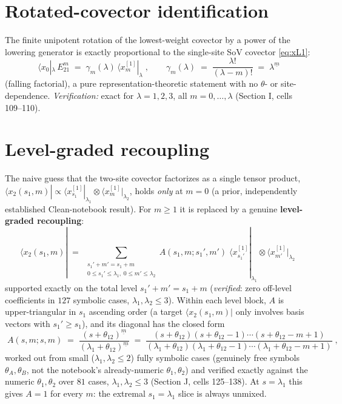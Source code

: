 \documentclass[11pt]{article}
\newcommand{\ffact}[2]{#1^{\underline{#2}}}   %
\begin{document}
\section{Rotated-covector identification}
\label{sec:covector-id}

The finite unipotent rotation of the lowest-weight covector by a power of the lowering generator is
exactly proportional to the single-site SoV covector \eqref{eq:xL1}:
\begin{equation}
  \boxed{\;\langle x_0|_\lambda\, E_{21}^m \;=\; \gamma_m(\lambda)\,\langle x^{[1]}_m|_\lambda\;},
  \qquad
  \gamma_m(\lambda) \;=\; \frac{\lambda!}{(\lambda-m)!} \;=\; \ffact{\lambda}{m}
  \label{eq:gamma}
\end{equation}
(falling factorial), a pure representation-theoretic statement with no $\theta$- or site-dependence.
\emph{Verification:} exact for $\lambda=1,2,3$, all $m=0,\dots,\lambda$ (Section I, cells 109--110).

\section{Level-graded recoupling}
\label{sec:recoupling}

The naive guess that the two-site covector factorizes as a single tensor product,
$\langle x_2(s_1,m)| \propto \langle x^{[1]}_{s_1}|_{\lambda_1}\otimes\langle x^{[1]}_m|_{\lambda_2}$,
holds \emph{only} at $m=0$ (a prior, independently established Clean-notebook result). For $m\ge1$
it is replaced by a genuine \textbf{level-graded recoupling}:
\begin{equation}
  \boxed{\;\langle x_2(s_1,m)| \;=\;\!\!\sum_{\substack{s_1'+m'=s_1+m\\ 0\le s_1'\le\lambda_1,\;0\le m'\le\lambda_2}}\!\!
  A(s_1,m;s_1',m')\;\langle x^{[1]}_{s_1'}|_{\lambda_1}\otimes\langle x^{[1]}_{m'}|_{\lambda_2}\;}
  \label{eq:A-decomp}
\end{equation}
supported exactly on the total level $s_1'+m'=s_1+m$ (\emph{verified}: zero off-level coefficients
in $127$ symbolic cases, $\lambda_1,\lambda_2\le3$). Within each level block, $A$ is upper-triangular
in $s_1$ ascending order (a target $\langle x_2(s_1,m)|$ only involves basis vectors with
$s_1'\ge s_1$), and its diagonal has the closed form
\begin{equation}
  \boxed{\;A(s,m;s,m) \;=\; \frac{\ffact{(s+\theta_{12})}{m}}{\ffact{(\lambda_1+\theta_{12})}{m}}
  \;=\; \frac{(s+\theta_{12})(s+\theta_{12}-1)\cdots(s+\theta_{12}-m+1)}
             {(\lambda_1+\theta_{12})(\lambda_1+\theta_{12}-1)\cdots(\lambda_1+\theta_{12}-m+1)}\;},
  \label{eq:A-diag}
\end{equation}
worked out from small ($\lambda_1,\lambda_2\le2$) fully symbolic cases (genuinely free symbols
$\theta_A,\theta_B$, not the notebook's already-numeric $\theta_1,\theta_2$) and verified exactly
against the numeric $\theta_1,\theta_2$ over $81$ cases, $\lambda_1,\lambda_2\le3$ (Section J, cells
125--138). At $s=\lambda_1$ this gives $A=1$ for every $m$: the extremal $s_1=\lambda_1$ slice is
always unmixed.
\end{document}
